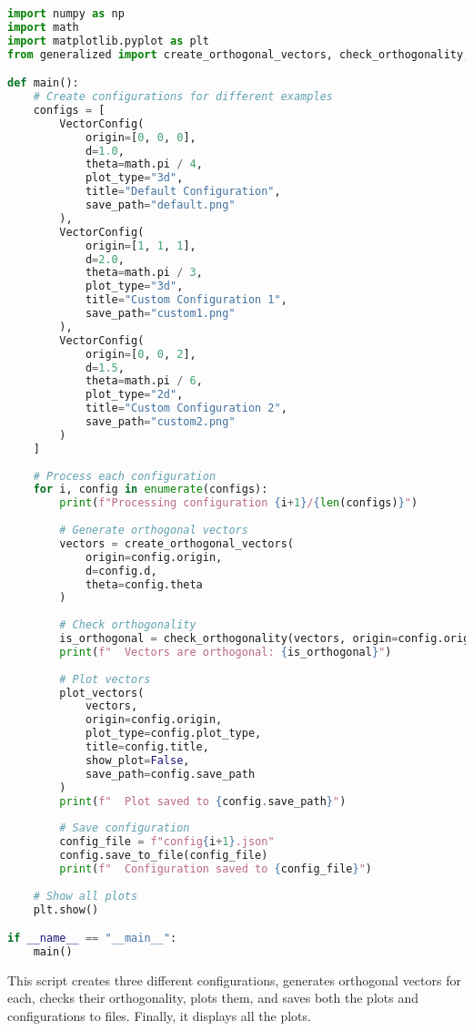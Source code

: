 \begin{lstlisting}[language=Python]
import numpy as np
import math
import matplotlib.pyplot as plt
from generalized import create_orthogonal_vectors, check_orthogonality, plot_vectors, VectorConfig

def main():
    # Create configurations for different examples
    configs = [
        VectorConfig(
            origin=[0, 0, 0],
            d=1.0,
            theta=math.pi / 4,
            plot_type="3d",
            title="Default Configuration",
            save_path="default.png"
        ),
        VectorConfig(
            origin=[1, 1, 1],
            d=2.0,
            theta=math.pi / 3,
            plot_type="3d",
            title="Custom Configuration 1",
            save_path="custom1.png"
        ),
        VectorConfig(
            origin=[0, 0, 2],
            d=1.5,
            theta=math.pi / 6,
            plot_type="2d",
            title="Custom Configuration 2",
            save_path="custom2.png"
        )
    ]
    
    # Process each configuration
    for i, config in enumerate(configs):
        print(f"Processing configuration {i+1}/{len(configs)}")
        
        # Generate orthogonal vectors
        vectors = create_orthogonal_vectors(
            origin=config.origin,
            d=config.d,
            theta=config.theta
        )
        
        # Check orthogonality
        is_orthogonal = check_orthogonality(vectors, origin=config.origin)
        print(f"  Vectors are orthogonal: {is_orthogonal}")
        
        # Plot vectors
        plot_vectors(
            vectors,
            origin=config.origin,
            plot_type=config.plot_type,
            title=config.title,
            show_plot=False,
            save_path=config.save_path
        )
        print(f"  Plot saved to {config.save_path}")
        
        # Save configuration
        config_file = f"config{i+1}.json"
        config.save_to_file(config_file)
        print(f"  Configuration saved to {config_file}")
    
    # Show all plots
    plt.show()

if __name__ == "__main__":
    main()
\end{lstlisting}

This script creates three different configurations, generates orthogonal vectors for each, checks their orthogonality, plots them, and saves both the plots and configurations to files. Finally, it displays all the plots.
